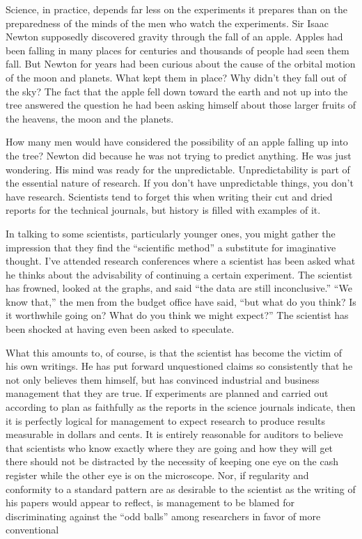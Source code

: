 \documentclass[a4paper]{article}
\begin{document}
\par
Science, in practice, depends far less on the experiments it prepares than on the preparedness of the minds of the men who watch the experiments. Sir Isaac Newton supposedly discovered gravity through the fall of an apple. Apples had been falling in many places for centuries and thousands of people had seen them fall. But Newton for years had been curious about the cause of the orbital motion of the moon and planets. What kept them in place? Why didn’t they fall out of the sky? The fact that the apple fell down toward the earth and not up into the tree answered the question he had been asking himself about those larger fruits of the heavens, the moon and the planets.

\par
How many men would have considered the possibility of an apple falling up into the tree? Newton did because he was not trying to predict anything. He was just wondering. His mind was ready for the unpredictable. Unpredictability is part of the essential nature of research. If you don’t have unpredictable things, you don’t have research. Scientists tend to forget this when writing their cut and dried reports for the technical journals, but history is filled with examples of it.

\par
In talking to some scientists, particularly younger ones, you might gather the impression that they find the “scientific method” a substitute for imaginative thought. I’ve attended research conferences where a scientist has been asked what he thinks about the advisability of continuing a certain experiment. The scientist has frowned, looked at the graphs, and said “the data are still inconclusive.” “We know that,” the men from the budget office have said, “but what do you think? Is it worthwhile going on? What do you think we might expect?” The scientist has been shocked at having even been asked to speculate.

\par
What this amounts to, of course, is that the scientist has become the victim of his own writings. He has put forward unquestioned claims so consistently that he not only believes them himself, but has convinced industrial and business management that they are true. If experiments are planned and carried out according to plan as faithfully as the reports in the science journals indicate, then it is perfectly logical for management to expect research to produce results measurable in dollars and cents. It is entirely reasonable for auditors to believe that scientists who know exactly where they are going and how they will get there should not be distracted by the necessity of keeping one eye on the cash register while the other eye is on the microscope. Nor, if regularity and conformity to a standard pattern are as desirable to the scientist as the writing of his papers would appear to reflect, is management to be blamed for discriminating against the “odd balls” among researchers in favor of more conventional
\end{document}
